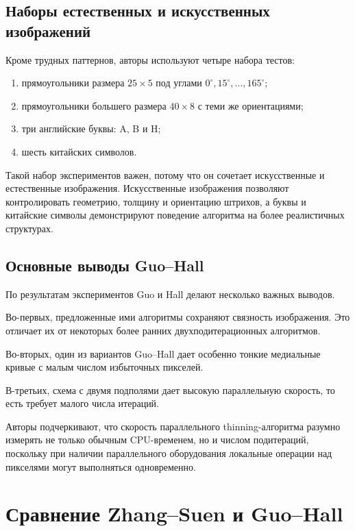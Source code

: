 \documentclass[12pt,a4paper]{article}
\begin{document}
	\subsection{Наборы естественных и искусственных изображений}
	
	Кроме трудных паттернов, авторы используют четыре набора тестов:
	
	\begin{enumerate}
		\item прямоугольники размера $25\times5$ под углами $0^\circ,15^\circ,\ldots,165^\circ$;
		\item прямоугольники большего размера $40\times8$ с теми же ориентациями;
		\item три английские буквы: A, B и H;
		\item шесть китайских символов.
	\end{enumerate}
	
	Такой набор экспериментов важен, потому что он сочетает искусственные и естественные изображения. Искусственные изображения позволяют контролировать геометрию, толщину и ориентацию штрихов, а буквы и китайские символы демонстрируют поведение алгоритма на более реалистичных структурах.
	
	\subsection{Основные выводы Guo--Hall}
	
	По результатам экспериментов Guo и Hall делают несколько важных выводов.
	
	Во-первых, предложенные ими алгоритмы сохраняют связность изображения. Это отличает их от некоторых более ранних двухподитерационных алгоритмов.
	
	Во-вторых, один из вариантов Guo--Hall дает особенно тонкие медиальные кривые с малым числом избыточных пикселей.
	
	В-третьих, схема с двумя подполями дает высокую параллельную скорость, то есть требует малого числа итераций.
	
	Авторы подчеркивают, что скорость параллельного thinning-алгоритма разумно измерять не только обычным CPU-временем, но и числом подитераций, поскольку при наличии параллельного оборудования локальные операции над пикселями могут выполняться одновременно.
	
	\section{Сравнение Zhang--Suen и Guo--Hall}
	
\end{document}
